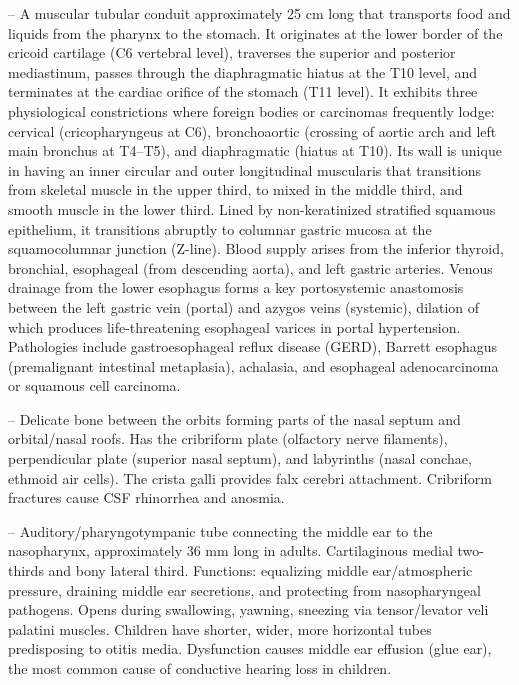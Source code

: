 -- A muscular tubular conduit approximately 25 cm long that transports food and liquids from the pharynx to the stomach. It originates at the lower border of the cricoid cartilage (C6 vertebral level), traverses the superior and posterior mediastinum, passes through the diaphragmatic hiatus at the T10 level, and terminates at the cardiac orifice of the stomach (T11 level). It exhibits three physiological constrictions where foreign bodies or carcinomas frequently lodge: cervical (cricopharyngeus at C6), bronchoaortic (crossing of aortic arch and left main bronchus at T4--T5), and diaphragmatic (hiatus at T10). Its wall is unique in having an inner circular and outer longitudinal muscularis that transitions from skeletal muscle in the upper third, to mixed in the middle third, and smooth muscle in the lower third. Lined by non-keratinized stratified squamous epithelium, it transitions abruptly to columnar gastric mucosa at the squamocolumnar junction (Z-line). Blood supply arises from the inferior thyroid, bronchial, esophageal (from descending aorta), and left gastric arteries. Venous drainage from the lower esophagus forms a key portosystemic anastomosis between the left gastric vein (portal) and azygos veins (systemic), dilation of which produces life-threatening esophageal varices in portal hypertension. Pathologies include gastroesophageal reflux disease (GERD), Barrett esophagus (premalignant intestinal metaplasia), achalasia, and esophageal adenocarcinoma or squamous cell carcinoma.

-- Delicate bone between the orbits forming parts of the nasal septum and orbital/nasal roofs. Has the cribriform plate (olfactory nerve filaments), perpendicular plate (superior nasal septum), and labyrinths (nasal conchae, ethmoid air cells). The crista galli provides falx cerebri attachment. Cribriform fractures cause CSF rhinorrhea and anosmia.

-- Auditory/pharyngotympanic tube connecting the middle ear to the nasopharynx, approximately 36 mm long in adults. Cartilaginous medial two-thirds and bony lateral third. Functions: equalizing middle ear/atmospheric pressure, draining middle ear secretions, and protecting from nasopharyngeal pathogens. Opens during swallowing, yawning, sneezing via tensor/levator veli palatini muscles. Children have shorter, wider, more horizontal tubes predisposing to otitis media. Dysfunction causes middle ear effusion (glue ear), the most common cause of conductive hearing loss in children.

